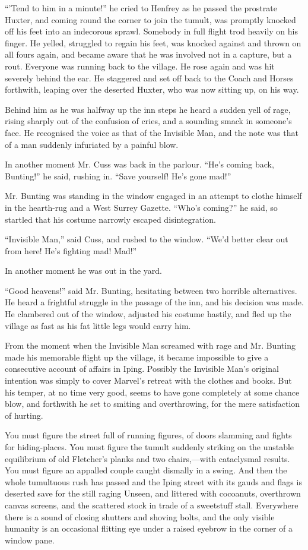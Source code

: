 “\kern1pt’Tend to him in a minute!” he cried to Henfrey as he passed the prostrate Huxter, and coming round the corner to join the tumult, was promptly knocked off his feet into an indecorous sprawl. Somebody in full flight trod heavily on his finger. He yelled, struggled to regain his feet, was knocked against and thrown on all fours again, and became aware that he was involved not in a capture, but a rout. Everyone was running back to the village. He rose again and was hit severely behind the ear. He staggered and set off back to the Coach and Horses forthwith, leaping over the deserted Huxter, who was now sitting up, on his way.

Behind him as he was halfway up the inn steps he heard a sudden yell of rage, rising sharply out of the confusion of cries, and a sounding smack in someone’s face. He recognised the voice as that of the Invisible Man, and the note was that of a man suddenly infuriated by a painful blow.

In another moment Mr. Cuss was back in the parlour. “He’s coming back, Bunting!” he said, rushing in. “Save yourself! He’s gone mad!”

Mr. Bunting was standing in the window engaged in an attempt to clothe himself in the hearth-rug and a West Surrey Gazette. “Who’s coming?” he said, so startled that his costume narrowly escaped disintegration.

“Invisible Man,” said Cuss, and rushed to the window. “We’d better clear out from here! He’s fighting mad! Mad!”

In another moment he was out in the yard.

“Good heavens!” said Mr. Bunting, hesitating between two horrible alternatives. He heard a frightful struggle in the passage of the inn, and his decision was made. He clambered out of the window, adjusted his costume hastily, and fled up the village as fast as his fat little legs would carry him.

From the moment when the Invisible Man screamed with rage and Mr. Bunting made his memorable flight up the village, it became impossible to give a consecutive account of affairs in Iping. Possibly the Invisible Man’s original intention was simply to cover Marvel’s retreat with the clothes and books. But his temper, at no time very good, seems to have gone completely at some chance blow, and forthwith he set to smiting and overthrowing, for the mere satisfaction of hurting.

You must figure the street full of running figures, of doors slamming and fights for hiding-places. You must figure the tumult suddenly striking on the unstable equilibrium of old Fletcher’s planks and two chairs,—with cataclysmal results. You must figure an appalled couple caught dismally in a swing. And then the whole tumultuous rush has passed and the Iping street with its gauds and flags is deserted save for the still raging Unseen, and littered with cocoanuts, overthrown canvas screens, and the scattered stock in trade of a sweetstuff stall. Everywhere there is a sound of closing shutters and shoving bolts, and the only visible humanity is an occasional flitting eye under a raised eyebrow in the corner of a window pane.

